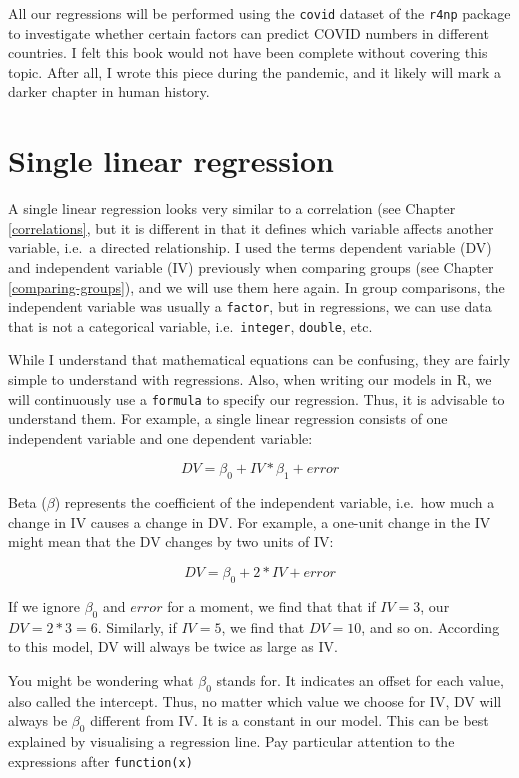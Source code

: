 \documentclass[
]{book}
\begin{document}
All our regressions will be performed using the \texttt{covid} dataset of the \texttt{r4np} package to investigate whether certain factors can predict COVID numbers in different countries. I felt this book would not have been complete without covering this topic. After all, I wrote this piece during the pandemic, and it likely will mark a darker chapter in human history.

\hypertarget{single-linear-regression}{%
\section{Single linear regression}\label{single-linear-regression}}

A single linear regression looks very similar to a correlation (see Chapter \ref{correlations}, but it is different in that it defines which variable affects another variable, i.e.~a directed relationship. I used the terms dependent variable (DV) and independent variable (IV) previously when comparing groups (see Chapter \ref{comparing-groups}), and we will use them here again. In group comparisons, the independent variable was usually a \texttt{factor}, but in regressions, we can use data that is not a categorical variable, i.e.~\texttt{integer}, \texttt{double}, etc.

While I understand that mathematical equations can be confusing, they are fairly simple to understand with regressions. Also, when writing our models in R, we will continuously use a \texttt{formula} to specify our regression. Thus, it is advisable to understand them. For example, a single linear regression consists of one independent variable and one dependent variable:

\[
DV = \beta_{0} + IV * \beta_{1} + error
\]

Beta (\(\beta\)) represents the coefficient of the independent variable, i.e.~how much a change in IV causes a change in DV. For example, a one-unit change in the IV might mean that the DV changes by two units of IV:

\leavevmode\hypertarget{single-linear-regression-example}{}%
\[
DV = \beta_0 + 2 * IV + error
\]

If we ignore \(\beta_0\) and \(error\) for a moment, we find that that if \(IV = 3\), our \(DV = 2*3 = 6\). Similarly, if \(IV = 5\), we find that \(DV = 10\), and so on. According to this model, DV will always be twice as large as IV.

You might be wondering what \(\beta_0\) stands for. It indicates an offset for each value, also called the intercept. Thus, no matter which value we choose for IV, DV will always be \(\beta_0\) different from IV. It is a constant in our model. This can be best explained by visualising a regression line. Pay particular attention to the expressions after \texttt{function(x)}
\end{document}
